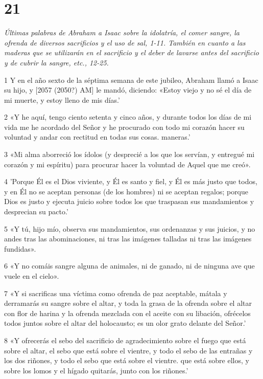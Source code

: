 \chapter{21}

\par \textit{Últimas palabras de Abraham a Isaac sobre la idolatría, el comer sangre, la ofrenda de diversos sacrificios y el uso de sal, 1-11. También en cuanto a las maderas que se utilizarán en el sacrificio y el deber de lavarse antes del sacrificio y de cubrir la sangre, etc., 12-25.}

\par 1 Y en el año sexto de la séptima semana de este jubileo, Abraham llamó a Isaac su hijo, y [2057 (2050?) AM] le mandó, diciendo: «Estoy viejo y no sé el día de mi muerte, y estoy lleno de mis días.'
\par 2 «Y he aquí, tengo ciento setenta y cinco años, y durante todos los días de mi vida me he acordado del Señor y he procurado con todo mi corazón hacer su voluntad y andar con rectitud en todas sus cosas. maneras.'
\par 3 «Mi alma aborreció los ídolos (y desprecié a los que los servían, y entregué mi corazón y mi espíritu) para procurar hacer la voluntad de Aquel que me creó».
\par 4 'Porque Él es el Dios viviente, y Él es santo y fiel, y Él es más justo que todos, y en Él no se aceptan personas (de los hombres) ni se aceptan regalos; porque Dios es justo y ejecuta juicio sobre todos los que traspasan sus mandamientos y desprecian su pacto.'
\par 5 «Y tú, hijo mío, observa sus mandamientos, sus ordenanzas y sus juicios, y no andes tras las abominaciones, ni tras las imágenes talladas ni tras las imágenes fundidas».
\par 6 «Y no comáis sangre alguna de animales, ni de ganado, ni de ninguna ave que vuele en el cielo».
\par 7 «Y si sacrificas una víctima como ofrenda de paz aceptable, mátala y derramarás su sangre sobre el altar, y toda la grasa de la ofrenda sobre el altar con flor de harina y la ofrenda mezclada con el aceite con su libación, ofrécelos todos juntos sobre el altar del holocausto; es un olor grato delante del Señor.'
\par 8 «Y ofrecerás el sebo del sacrificio de agradecimiento sobre el fuego que está sobre el altar, el sebo que está sobre el vientre, y todo el sebo de las entrañas y los dos riñones, y todo el sebo que está sobre el vientre. que está sobre ellos, y sobre los lomos y el hígado quitarás, junto con los riñones.'
